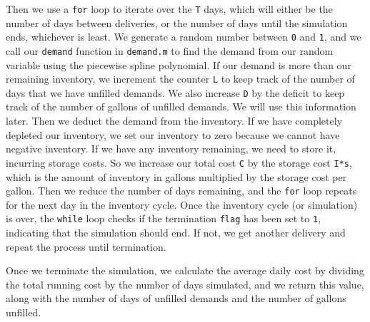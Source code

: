 \documentclass{article}
\begin{document}
    Then we use a \texttt{for} loop to iterate over the \texttt{T} days, which will either be the number of days between deliveries, or the number of days until the simulation ends, whichever is least. We generate a random number between \texttt{0} and \texttt{1}, and we call our \texttt{demand} function in \texttt{demand.m} to find the demand from our random variable using the piecewise spline polynomial. If our demand is more than our remaining inventory, we increment the counter \texttt{L} to keep track of the number of days that we have unfilled demands. We also increase \texttt{D} by the deficit to keep track of the number of gallons of unfilled demands. We will use this information later. Then we deduct the demand from the inventory. If we have completely depleted our inventory, we set our inventory to zero because we cannot have negative inventory. If we have any inventory remaining, we need to store it, incurring storage costs. So we increase our total cost \texttt{C} by the storage cost \texttt{I*s}, which is the amount of inventory in gallons multiplied by the storage cost per gallon. Then we reduce the number of days remaining, and the \texttt{for} loop repeats for the next day in the inventory cycle. Once the inventory cycle (or simulation) is over, the \texttt{while} loop checks if the termination \texttt{flag} has been set to \texttt{1}, indicating that the simulation should end. If not, we get another delivery and repeat the process until termination.

    Once we terminate the simulation, we calculate the average daily cost by dividing the total running cost by the number of days simulated, and we return this value, along with the number of days of unfilled demands and the number of gallons unfilled.
\end{document}
